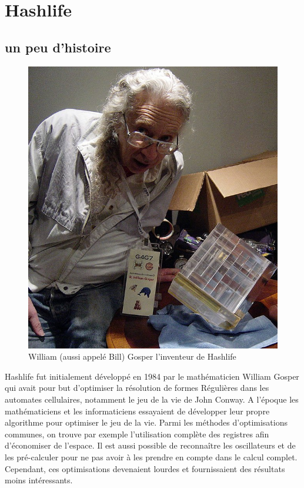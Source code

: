 \section{Hashlife}
\subsection{un peu d'histoire}
\begin{figure}[htp]
        \center
        \includegraphics[scale=0.2]{images/imgHashlife/Bill_Gosper_2006.jpg}
        \caption{William (aussi appelé Bill) Gosper l'inventeur de Hashlife}
\end{figure}

Hashlife fut initialement développé en 1984 par le mathématicien William Gosper qui avait pour but d'optimiser la résolution de formes Régulières dans les automates cellulaires, notamment le jeu de la vie de John Conway. A l'époque les mathématiciens et les informaticiens essayaient de développer leur propre algorithme pour optimiser le jeu de la vie. Parmi les méthodes d'optimisations communes, on trouve par exemple l'utilisation complète des registres afin d'économiser de l'espace. Il est aussi possible de reconnaître les oscillateurs et de les pré-calculer pour ne pas avoir à les prendre en compte dans le calcul complet. Cependant, ces optimisations devenaient lourdes et fournissaient des résultats moins intéressants.

